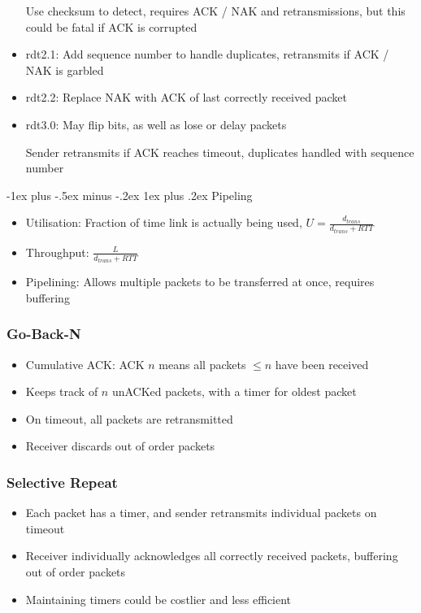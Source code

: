 \documentclass[10pt, landscape]{article}
\makeatletter
\renewcommand{\subsection}{\@startsection{subsection}{3}{0mm}%
                                {-1ex plus -.5ex minus -.2ex}%
                                {1ex plus .2ex}%
                                {\normalfont\small\bfseries}}%
\makeatother
\begin{document}
\begin{multicols*}{3}
\begin{itemize}
    Use checksum to detect, requires ACK / NAK and retransmissions, but this could be fatal if ACK is corrupted
    \item rdt2.1: Add sequence number to handle duplicates, retransmits if ACK / NAK is garbled
    \item rdt2.2: Replace NAK with ACK of last correctly received packet
    \item rdt3.0: May flip bits, as well as lose or delay packets

    Sender retransmits if ACK reaches timeout, duplicates handled with sequence number
\end{itemize}

\subsection{Pipeling}
\begin{itemize}
    \item Utilisation: Fraction of time link is actually being used, $U=\frac{d_{trans}}{d_{trans}+RTT}$
    \item Throughput: $\frac{L}{d_{trans}+RTT}$
    \item Pipelining: Allows multiple packets to be transferred at once, requires buffering
\end{itemize}

\subsubsection{Go-Back-N}
\begin{itemize}
    \item Cumulative ACK: ACK $n$ means all packets $\leq n$ have been received
    \item Keeps track of $n$ unACKed packets, with a timer for oldest packet
    \item On timeout, all packets are retransmitted
    \item Receiver discards out of order packets
\end{itemize}

\subsubsection{Selective Repeat}
\begin{itemize}
    \item Each packet has a timer, and sender retransmits individual packets on timeout
    \item Receiver individually acknowledges all correctly received packets, buffering out of order packets
    \item Maintaining timers could be costlier and less efficient
\end{itemize}


\end{multicols*}
\end{document}
